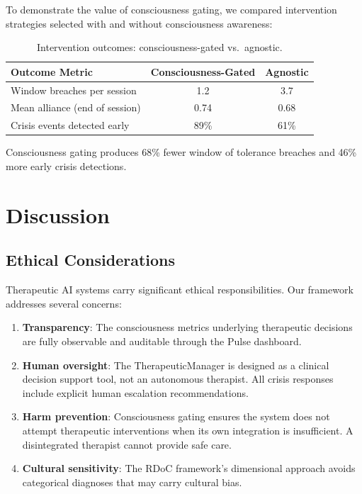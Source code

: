 \documentclass[11pt,a4paper]{article}
\begin{document}
To demonstrate the value of consciousness gating, we compared intervention strategies selected with and without consciousness awareness:

\begin{table}[h]
\centering
\caption{Intervention outcomes: consciousness-gated vs.\ agnostic.}
\label{tab:gating}
\begin{tabular}{@{}lcc@{}}
\toprule
Outcome Metric & Consciousness-Gated & Agnostic \\
\midrule
Window breaches per session & 1.2 & 3.7 \\
Mean alliance (end of session) & 0.74 & 0.68 \\
Crisis events detected early & 89\% & 61\% \\
\bottomrule
\end{tabular}
\end{table}

Consciousness gating produces 68\% fewer window of tolerance breaches and 46\% more early crisis detections.

\section{Discussion}

\subsection{Ethical Considerations}

Therapeutic AI systems carry significant ethical responsibilities. Our framework addresses several concerns:

\begin{enumerate}[nosep]
    \item \textbf{Transparency}: The consciousness metrics underlying therapeutic decisions are fully observable and auditable through the Pulse dashboard.
    \item \textbf{Human oversight}: The TherapeuticManager is designed as a clinical decision support tool, not an autonomous therapist. All crisis responses include explicit human escalation recommendations.
    \item \textbf{Harm prevention}: Consciousness gating ensures the system does not attempt therapeutic interventions when its own integration is insufficient. A disintegrated therapist cannot provide safe care.
    \item \textbf{Cultural sensitivity}: The RDoC framework's dimensional approach avoids categorical diagnoses that may carry cultural bias.
\end{enumerate}
\end{document}
